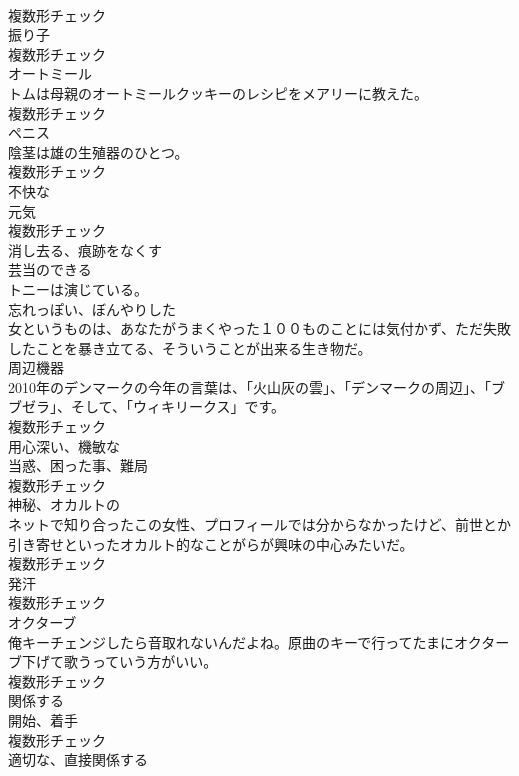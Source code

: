 \documentclass[8pt]{extreport}
\begin{document}
\begin{CJK}{UTF8}{min}
\\	複数形チェック
\\	[名詞]	振り子	
\\	複数形チェック
\\	[名詞]	オートミール	
\\	トムは母親のオートミールクッキーのレシピをメアリーに教えた。	
\\	複数形チェック
\\	[名詞]	ペニス	
\\	陰茎は雄の生殖器のひとつ。	
\\	複数形チェック
\\	[形容詞]	不快な	
\\	[名詞]	元気	
\\	複数形チェック
\\	[動詞]	消し去る、痕跡をなくす	
\\	[形容詞]	芸当のできる	
\\	トニーは演じている。	
\\	[形容詞]	忘れっぽい、ぼんやりした	
\\	女というものは、あなたがうまくやった１００ものことには気付かず、ただ失敗したことを暴き立てる、そういうことが出来る生き物だ。	
\\	[名詞]	周辺機器	
\\	2010年のデンマークの今年の言葉は、「火山灰の雲」、「デンマークの周辺」、「ブブゼラ」、そして、「ウィキリークス」です。	
\\	複数形チェック
\\	[形容詞]	用心深い、機敏な	
\\	[名詞]	当惑、困った事、難局	
\\	複数形チェック
\\	[名詞]	神秘、オカルトの	
\\	ネットで知り合ったこの女性、プロフィールでは分からなかったけど、前世とか引き寄せといったオカルト的なことがらが興味の中心みたいだ。	
\\	複数形チェック
\\	[名詞]	発汗	
\\	複数形チェック
\\	[名詞]	オクターブ	
\\	俺キーチェンジしたら音取れないんだよね。原曲のキーで行ってたまにオクターブ下げて歌うっていう方がいい。	
\\	複数形チェック
\\	[動詞]	関係する	
\\	[名詞]	開始、着手	
\\	複数形チェック
\\	[形容詞]	適切な、直接関係する	

\end{CJK}
\end{document}
